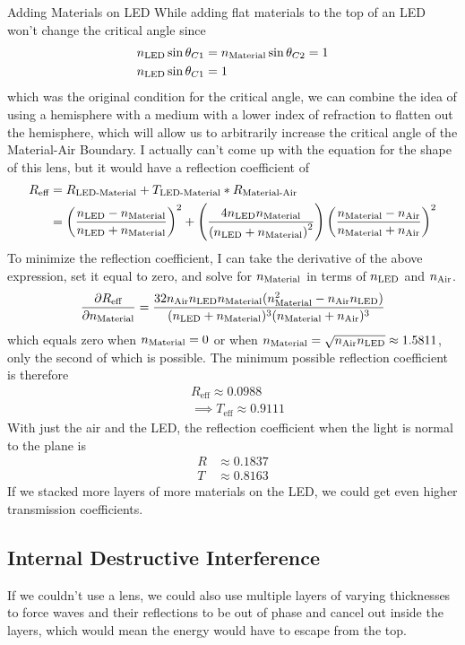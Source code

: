 \documentclass[12pt]{article}
\newcommand{\enterProblemHeader}[1]{
	\rhead{#1}
}
\newenvironment{main_section}[1]{
	\section{#1}
	\enterProblemHeader{#1}
}{
	\pagebreak
}
\newcommand{\pderiv}[2]{\frac{\partial #1}{\partial #2}}
\begin{document}
\begin{main_section}{Adding Materials on LED}
	While adding flat materials to the top of an LED won't change the critical
	angle since
	\begin{align*}
		&n_\text{LED} \sin \theta_{C1} = n_\text{Material} \sin \theta_{C2} = 1\\
		&n_\text{LED} \sin \theta_{C1} = 1
	\end{align*}
	which was the original condition for the critical angle, we can combine the
	idea of using a hemisphere with a medium with a lower index of refraction to
	flatten out the hemisphere, which will allow us to arbitrarily increase the
	critical angle of the Material-Air Boundary. I actually can't come up with
	the equation for the shape of this lens, but it would have a reflection
	coefficient of
	\begin{align*}
		R_\text{eff} &= R_\text{LED-Material} + T_\text{LED-Material} * R_\text{Material-Air}\\
		&= \left( \frac {n_\text{LED} - n_\text{Material}} {n_\text{LED} + n_\text{Material}} \right)^2 + \left( \frac
		{4 n_\text{LED} n_\text{Material}} {\left( n_\text{LED} + n_\text{Material} \right)^2} \right) \left( \frac
		{n_\text{Material} - n_\text{Air}} {n_\text{Material} + n_\text{Air}} \right)^2
	\end{align*}
	To minimize the reflection coefficient, I can take the derivative of the
	above expression, set it equal to zero, and solve for $n_\text{Material}$ in terms of
	$n_\text{LED}$ and $n_\text{Air}$.
	\[
		\pderiv { R_\text{eff} } { \nmat } = \frac {32 \nair \nled \nmat
		(\nmat^2 - \nair \nled)} { (\nled + \nmat)^3 (\nmat + \nair)^3 }
	\]
	which equals zero when $n_\text{Material} = 0$ or when $n_\text{Material} = \sqrt{ n_\text{Air} n_\text{LED} }
	\approx 1.5811$, only the second of which is possible. The minimum possible
	reflection coefficient is therefore
	\begin{align*}
		&R_\text{eff} \approx 0.0988\\
		&\implies T_\text{eff} \approx 0.9111
	\end{align*}
	With just the air and the LED, the reflection coefficient when the light is
	normal to the plane is
	\begin{align*}
		R &\approx 0.1837\\
		T &\approx 0.8163
	\end{align*}
	If we stacked more layers of more materials on the LED, we could get even
	higher transmission coefficients.

	\subsection{Internal Destructive Interference}
	If we couldn't use a lens, we could also use multiple layers of varying
	thicknesses to force waves and their reflections to be out of phase and
	cancel out inside the layers, which would mean the energy would have to
	escape from the top.
\end{main_section}
\end{document}

